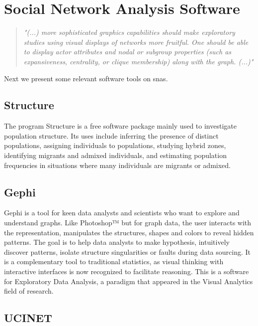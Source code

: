 \section{Social Network Analysis Software}
\label{sec:snas}

\begin{quote}
\textit{"(...) more sophisticated graphics capabilities should make exploratory studies using visual displays of networks more fruitful. One should be able to display actor attributes and nodal or subgroup properties (such as expansiveness, centrality, or clique membership) along with the graph. (...)"} \citep{wasserman1994social}
\end{quote}

Next we present some relevant software tools on \glspl{sna}.

\subsection{Structure}

\indent \indent The program Structure \citep{structure-software} is a free software package mainly used to investigate population structure. Its uses include inferring the presence of distinct populations, assigning individuals to populations, studying hybrid zones, identifying migrants and admixed individuals, and estimating population frequencies in situations where many individuals are migrants or admixed.

\subsection{Gephi}

\indent \indent Gephi \citep{bastian2009gephi} is a tool for keen data analysts and scientists who want to explore and understand graphs. Like Photoshop™ but for graph data, the user interacts with the representation, manipulates the structures, shapes and colors to reveal hidden patterns. The goal is to help data analysts to make hypothesis, intuitively discover patterns, isolate structure singularities or faults during data sourcing. It is a complementary tool to traditional statistics, as visual thinking with interactive interfaces is now recognized to facilitate reasoning. This is a software for Exploratory Data Analysis, a paradigm that appeared in the Visual Analytics field of research.

\subsection{UCINET}

